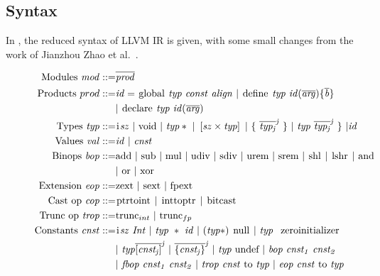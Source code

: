 \subsection{Syntax}
In , the reduced syntax of LLVM IR is given, with some small changes from the work of Jianzhou Zhao et al.~\cite{Zhao:2012:FLI:2103656.2103709}.\begin{figure}[!htb]
\begin{align*}
\begin{aligned}
\text{Modules }\mathit{mod} ::= &\overline{\mathit{prod}} \\
\text{Products }prod ::= & \mathit{id =\ }\kw{global}\ \mathit{typ}\ \mathit{const}\ \mathit{align}\ |\ \kw{define} \mathit{\ typ\ id(\overline{arg})\{\overline{b}\}}\\
&|\ \kw{declare} \mathit{\ typ\ id(\overline{arg})} \\
\text{Types } \mathit{typ} ::= &\kw{i} \mathit{sz\ |\ } \kw{void} \mathit{\ |\ typ*\ |\ \left[sz \times typ\right]\ |\ \lbrace\ \overline{typ_{j}}^{j}\ \rbrace\ |\ typ\ \overline{typ_{j}}^{j}\ \rbrace\ | id} \\
\text{Values } \mathit{val} ::= &\mathit{ id\ |\ cnst} \\
\text{Binops } \mathit{bop} ::= &\kw{add} \ |\ \kw{sub}\ |\ \kw{mul}\ |\ \kw{udiv}\ |\ \kw{sdiv}\ |\ \kw{urem}\ |\ \kw{srem}\ |\ \kw{shl}\ |\ \kw{lshr}\ |\ \kw{and}\\
&|\ \kw{or}\ |\ \kw{xor} \\
\text{Extension } \mathit{eop} ::= &\kw{zext} \ |\ \kw{sext} \ |\ \kw{fpext} \\
\text{Cast op } \mathit{cop} ::= &%
\kw{ptrtoint} \ |\ \kw{inttoptr} \ |\ \kw{bitcast} \\
\text{Trunc op } \mathit{trop} ::= &\kw{trunc}_{int} \ |\ \kw{trunc}_{fp} \\
\text{Constants } \mathit{cnst} ::= &\kw{i}\mathit{sz\ Int\ |\ }
\mathit{typ\ *\ id\ |\ (typ*)\ } \kw{null}\mathit{\ |\ typ\ } \kw{zeroinitializer} \\
&\mathit{|\ typ\overline{[cnst_{j}]}^{j}\ |\ \overline{\lbrace cnst_{j} \rbrace}^{j}\ |\ typ\ }\kw{undef}\mathit{\ |\ bop\ cnst_{1}\ cnst_{2}} \\
&\mathit{|\ fbop\ cnst_{1}\ cnst_{2}\ |\ trop\ cnst\ }\kw{to}\mathit{\ typ\ |\ eop\ cnst\ }\kw{to}\mathit{\ typ}\\

\end{aligned}
\end{align*}
\end{figure}
